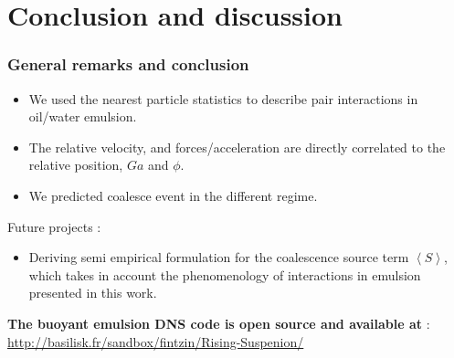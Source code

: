 \documentclass{sintefbeamer}
\newcommand{\avg}[1]{\left<#1\right>}
\begin{document}
\section{Conclusion and discussion}
\begin{frame}
  \frametitle{General remarks and conclusion}

  \begin{itemize}
    \item We used the nearest particle statistics to describe pair interactions in oil/water emulsion. 
    \item The relative velocity, and forces/acceleration are directly correlated to the relative position, $Ga$ and $\phi$. 
    \item We predicted coalesce event in the different regime. 
  \end{itemize}
  Future projects :   
  \begin{itemize}
    \item Deriving semi empirical formulation for the coalescence source term $\avg{S}$, which takes in account the phenomenology of interactions in emulsion presented in this work. 
  \end{itemize}

\vspace{1cm}
\textbf{The buoyant emulsion DNS code is open source and available at} : 
\url{http://basilisk.fr/sandbox/fintzin/Rising-Suspenion/}
\end{frame}
\end{document}
